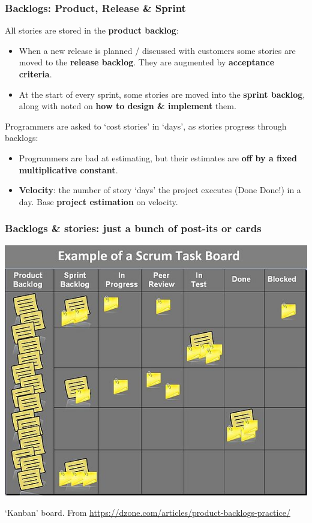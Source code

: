 \documentclass{beamer} %
\newcommand\emc[1]{\textcolor{brightblue}{\textbf{#1}}}
\begin{document}
\begin{frame}

\frametitle{Backlogs: Product, Release \& Sprint}

All stories are stored in the \emc{product backlog}:
\begin{itemize}
  \item When a new release is planned / discussed with customers some stories are moved to the \emc{release backlog}. They are augmented by \emc{acceptance criteria}.
  \item At the start of every sprint, some stories are moved into the \emc{sprint backlog}, along with noted on \emc{how to design \& implement} them.
  \end{itemize}

Programmers are asked to `cost stories' in `days', as stories progress through backlogs:
\begin{itemize}
  \item Programmers are bad at estimating, but their estimates are \emc{off by a fixed multiplicative constant}.
  \item \emc{Velocity}: the number of story `days' the project executes (Done Done!) in a day. Base \emc{project estimation} on velocity.
\end{itemize} 

\end{frame}


\begin{frame}

\frametitle{Backlogs \& stories: just a bunch of post-its or cards}

\begin{center}
\includegraphics[scale=0.50]{assets/backlog} 
\end{center}


`Kanban' board. From \url{https://dzone.com/articles/product-backlogs-practice/}

\end{frame}
\end{document}
